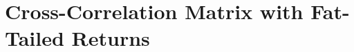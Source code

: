 \documentclass{book}
\begin{document}

\chapter{Cross-Correlation Matrix with Fat-Tailed Returns}


\end{document}
